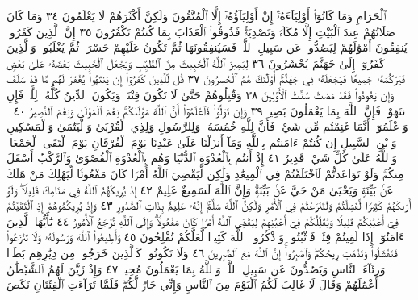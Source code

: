 ٱلْحَرَامِ وَمَا كَانُوٓا۟ أَوْلِيَآءَهُۥٓۚ إِنْ أَوْلِيَآؤُهُۥٓ إِلَّا ٱلْمُتَّقُونَ
وَلَٰكِنَّ أَكْثَرَهُمْ لَا يَعْلَمُونَ ٣٤ وَمَا كَانَ صَلَاتُهُمْ
عِندَ ٱلْبَيْتِ إِلَّا مُكَآءࣰ وَتَصْدِيَةࣰۚ فَذُوقُوا۟ ٱلْعَذَابَ
بِمَا كُنتُمْ تَكْفُرُونَ ٣٥ إِنَّ ٱلَّذِينَ كَفَرُوا۟ يُنفِقُونَ
أَمْوَٰلَهُمْ لِيَصُدُّوا۟ عَن سَبِيلِ ٱللَّهِۚ فَسَيُنفِقُونَهَا ثُمَّ تَكُونُ
عَلَيْهِمْ حَسْرَةࣰ ثُمَّ يُغْلَبُونَۗ وَٱلَّذِينَ كَفَرُوٓا۟ إِلَىٰ جَهَنَّمَ
يُحْشَرُونَ ٣٦ لِيَمِيزَ ٱللَّهُ ٱلْخَبِيثَ مِنَ ٱلطَّيِّبِ وَيَجْعَلَ
ٱلْخَبِيثَ بَعْضَهُۥ عَلَىٰ بَعْضࣲ فَيَرْكُمَهُۥ جَمِيعࣰا فَيَجْعَلَهُۥ
فِي جَهَنَّمَۚ أُو۟لَٰٓئِكَ هُمُ ٱلْخَٰسِرُونَ ٣٧ قُل لِّلَّذِينَ
كَفَرُوٓا۟ إِن يَنتَهُوا۟ يُغْفَرْ لَهُم مَّا قَدْ سَلَفَ وَإِن يَعُودُوا۟
فَقَدْ مَضَتْ سُنَّتُ ٱلْأَوَّلِينَ ٣٨ وَقَٰتِلُوهُمْ حَتَّىٰ
لَا تَكُونَ فِتْنَةࣱ وَيَكُونَ ٱلدِّينُ كُلُّهُۥ لِلَّهِۚ فَإِنِ
ٱنتَهَوْا۟ فَإِنَّ ٱللَّهَ بِمَا يَعْمَلُونَ بَصِيرࣱ ٣٩ وَإِن تَوَلَّوْا۟
فَٱعْلَمُوٓا۟ أَنَّ ٱللَّهَ مَوْلَىٰكُمْۚ نِعْمَ ٱلْمَوْلَىٰ وَنِعْمَ ٱلنَّصِيرُ ٤٠
۞ وَٱعْلَمُوٓا۟ أَنَّمَا غَنِمْتُم مِّن شَيْءࣲ فَأَنَّ لِلَّهِ خُمُسَهُۥ وَلِلرَّسُولِ
وَلِذِي ٱلْقُرْبَىٰ وَٱلْيَتَٰمَىٰ وَٱلْمَسَٰكِينِ وَٱبْنِ ٱلسَّبِيلِ إِن
كُنتُمْ ءَامَنتُم بِٱللَّهِ وَمَآ أَنزَلْنَا عَلَىٰ عَبْدِنَا يَوْمَ ٱلْفُرْقَانِ
يَوْمَ ٱلْتَقَى ٱلْجَمْعَانِۗ وَٱللَّهُ عَلَىٰ كُلِّ شَيْءࣲ قَدِيرٌ ٤١ إِذْ
أَنتُم بِٱلْعُدْوَةِ ٱلدُّنْيَا وَهُم بِٱلْعُدْوَةِ ٱلْقُصْوَىٰ وَٱلرَّكْبُ
أَسْفَلَ مِنكُمْۚ وَلَوْ تَوَاعَدتُّمْ لَٱخْتَلَفْتُمْ فِي ٱلْمِيعَٰدِ
وَلَٰكِن لِّيَقْضِيَ ٱللَّهُ أَمْرࣰا كَانَ مَفْعُولࣰا لِّيَهْلِكَ مَنْ
هَلَكَ عَنۢ بَيِّنَةࣲ وَيَحْيَىٰ مَنْ حَيَّ عَنۢ بَيِّنَةࣲۗ وَإِنَّ ٱللَّهَ
لَسَمِيعٌ عَلِيمٌ ٤٢ إِذْ يُرِيكَهُمُ ٱللَّهُ فِي مَنَامِكَ قَلِيلࣰاۖ
وَلَوْ أَرَىٰكَهُمْ كَثِيرࣰا لَّفَشِلْتُمْ وَلَتَنَٰزَعْتُمْ فِي ٱلْأَمْرِ
وَلَٰكِنَّ ٱللَّهَ سَلَّمَۚ إِنَّهُۥ عَلِيمُۢ بِذَاتِ ٱلصُّدُورِ ٤٣ وَإِذْ
يُرِيكُمُوهُمْ إِذِ ٱلْتَقَيْتُمْ فِيٓ أَعْيُنِكُمْ قَلِيلࣰا وَيُقَلِّلُكُمْ
فِيٓ أَعْيُنِهِمْ لِيَقْضِيَ ٱللَّهُ أَمْرࣰا كَانَ مَفْعُولࣰاۗ وَإِلَى ٱللَّهِ
تُرْجَعُ ٱلْأُمُورُ ٤٤ يَٰٓأَيُّهَا ٱلَّذِينَ ءَامَنُوٓا۟ إِذَا لَقِيتُمْ فِئَةࣰ
فَٱثْبُتُوا۟ وَٱذْكُرُوا۟ ٱللَّهَ كَثِيرࣰا لَّعَلَّكُمْ تُفْلِحُونَ ٤٥
وَأَطِيعُوا۟ ٱللَّهَ وَرَسُولَهُۥ وَلَا تَنَٰزَعُوا۟ فَتَفْشَلُوا۟ وَتَذْهَبَ
رِيحُكُمْۖ وَٱصْبِرُوٓا۟ۚ إِنَّ ٱللَّهَ مَعَ ٱلصَّٰبِرِينَ ٤٦ وَلَا تَكُونُوا۟
كَٱلَّذِينَ خَرَجُوا۟ مِن دِيَٰرِهِم بَطَرࣰا وَرِئَآءَ ٱلنَّاسِ وَيَصُدُّونَ
عَن سَبِيلِ ٱللَّهِۚ وَٱللَّهُ بِمَا يَعْمَلُونَ مُحِيطࣱ ٤٧ وَإِذْ زَيَّنَ
لَهُمُ ٱلشَّيْطَٰنُ أَعْمَٰلَهُمْ وَقَالَ لَا غَالِبَ لَكُمُ ٱلْيَوْمَ مِنَ
ٱلنَّاسِ وَإِنِّي جَارࣱ لَّكُمْۖ فَلَمَّا تَرَآءَتِ ٱلْفِئَتَانِ نَكَصَ
